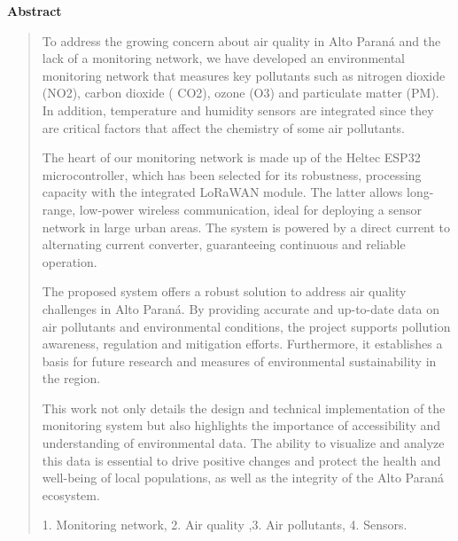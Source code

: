 \thispagestyle{empty}
\begin{center}
\begin{LARGE}
\textbf{Abstract}
\end{LARGE}
\end{center}

\begin{quotation}
To address the growing concern about air quality in Alto Paraná and the lack of a monitoring network, we have developed an environmental monitoring network that measures key pollutants such as nitrogen dioxide (NO2), carbon dioxide ( CO2), ozone (O3) and particulate matter (PM). In addition, temperature and humidity sensors are integrated since they are critical factors that affect the chemistry of some air pollutants.

The heart of our monitoring network is made up of the Heltec ESP32 microcontroller, which has been selected for its robustness, processing capacity with the integrated LoRaWAN module. The latter allows long-range, low-power wireless communication, ideal for deploying a sensor network in large urban areas. The system is powered by a direct current to alternating current converter, guaranteeing continuous and reliable operation.

The proposed system offers a robust solution to address air quality challenges in Alto Paraná. By providing accurate and up-to-date data on air pollutants and environmental conditions, the project supports pollution awareness, regulation and mitigation efforts. Furthermore, it establishes a basis for future research and measures of environmental sustainability in the region.

This work not only details the design and technical implementation of the monitoring system but also highlights the importance of accessibility and understanding of environmental data. The ability to visualize and analyze this data is essential to drive positive changes and protect the health and well-being of local populations, as well as the integrity of the Alto Paraná ecosystem.

\vspace*{0.5cm}

 1. Monitoring network, 2. Air quality
,3. Air pollutants, 4. Sensors.
\end{quotation}
